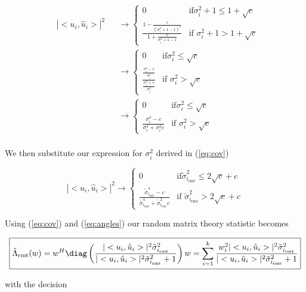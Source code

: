 \documentclass[english]{article}
\begin{document}
\begin{equation}
\begin{aligned}
&|<u_i,\hat{u}_i>|^2 
&& \to \begin{cases}
0 & \text{if} \sigma_i^2+1\leq 1+\sqrt{c}\\
\frac{1-\frac{c}{(\sigma_i^2+1-1)^2}}{1+\frac{c}{\sigma_i^2+1-1}} & \text{if } \sigma_i^2+1>1+\sqrt{c}
\end{cases}\\
&&&\to\begin{cases}
0 & \text{if} \sigma_i^2\leq\sqrt{c}\\
\frac{\frac{\sigma_i^4-c}{\sigma_i^4}}{\frac{\sigma_i^2+c}{\sigma_i^2}} & \text{if } \sigma_i^2>\sqrt{c}
\end{cases}\\
&&&\to\begin{cases}
0 & \text{if} \sigma_i^2\leq\sqrt{c}\\
\frac{\sigma_i^4-c}{\sigma_i^4+\sigma_i^2c} & \text{if } \sigma_i^2>\sqrt{c}
\end{cases}\\
\end{aligned}
\end{equation}

We then substitute our expression for $\sigma_i^2$ derived in (\ref{eq:cov})

\begin{equation}\label{eq:angles}
|<u_i,\hat{u}_i>|^2
\to\begin{cases}
0 & \text{if} \tilde{\sigma}_{i_\text{rmt}}^2\leq2\sqrt{c}+c\\
\frac{\tilde{\sigma}_{i_\text{rmt}}^4-c}{\tilde{\sigma}_{i_\text{rmt}}^4+\tilde{\sigma}_{i_\text{rmt}}^2c} & \text{if } \tilde{\sigma}_{i_\text{rmt}}^2>2\sqrt{c}+c
\end{cases}
\end{equation}

Using (\ref{eq:cov}) and (\ref{eq:angles}) our random matrix theory statistic becomes

\begin{equation}\label{eq:proc mr rmt}
\boxed{\tilde{\Lambda}_{\text{rmt}}(w) = w^H\diag\left(\frac{|<u_i,\hat{u}_i>|^2\tilde{\sigma}_{i_\text{rmt}}^2}{|<u_i,\hat{u}_i>|^2\tilde{\sigma}_{i_\text{rmt}}^2 + 1}\right)w = \sum_{i=1}^k\frac{w_i^2|<u_i,\hat{u}_i>|^2\tilde{\sigma}_{i_\text{rmt}}^2}{|<u_i,\hat{u}_i>|^2\tilde{\sigma}_{i_\text{rmt}}^2 + 1}}
\end{equation}

with the decision
\end{document}
